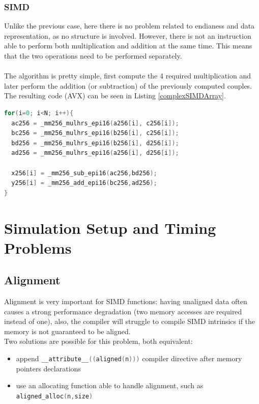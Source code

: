 \documentclass[a4paper]{article}
\begin{document}
\subsubsection{SIMD}
Unlike the previous case, here there is no problem related to endianess and data representation, as no structure is involved. However, there is not an instruction able to perform both multiplication and addition at the same time. This means that the two operations need to be performed separately.
\\\\The algorithm is pretty simple, first compute the 4 required multiplication and later perform the addition (or subtraction) of the previously computed couples. The resulting code (AVX) can be seen in Listing \ref{complexSIMDArray}.
\begin{lstlisting}[language=c,frame=tb,caption=AVX2 Complex Fixed Point Multiplication - Separated Array Fashion,label=complexSIMDArray]
for(i=0; i<N; i++){ 
  ac256 = _mm256_mulhrs_epi16(a256[i], c256[i]); 
  bc256 = _mm256_mulhrs_epi16(b256[i], c256[i]); 
  bd256 = _mm256_mulhrs_epi16(b256[i], d256[i]); 
  ad256 = _mm256_mulhrs_epi16(a256[i], d256[i]); 

  x256[i] = _mm256_sub_epi16(ac256,bd256); 
  y256[i] = _mm256_add_epi16(bc256,ad256); 
} 
\end{lstlisting}

\section{Simulation Setup and Timing Problems} \label{setup}
\subsection{Alignment}
Alignment is very important for SIMD functions: having unaligned data often causes a strong performance degradation (two memory accesses are required instead of one), also, the compiler will struggle to compile SIMD intrinsics if the memory is not guaranteed to be aligned.
\\Two solutions are possible for this problem, both equivalent:
\begin{itemize}
	\item append \lstinline[language=c, basicstyle=\ttfamily]{__attribute__((aligned(n)))} compiler directive after memory pointers declarations
	\item use an allocating function able to handle alignment, such as \lstinline[language=c, basicstyle=\ttfamily]{aligned_alloc(n,size)}
\end{itemize}
\end{document}
